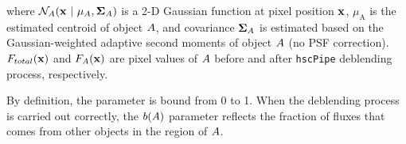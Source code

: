 \documentclass[useamsfonts]{pasj01}
\def\hscpipe{\texttt{hscPipe}}
\begin{document}
    \noindent
    where $\mathcal{N}_{\rm{A}}({ \bf x }\ |\  \mu_{\rm{A}}, {\bf\Sigma}_{\rm{A}})$
    is a 2-D Gaussian function at pixel position $\bf x$, $\mu_{\mathrm{A}}$ is the
    estimated centroid of object ${\rm A}$, and covariance ${\bf \Sigma}_{\mathrm{A}}$
    is estimated based on the Gaussian-weighted adaptive second moments of object
    ${\rm A}$ (no PSF correction).
    $F_{\mathrm{total}}({\bf x })$ and $F_{\rm{A}}({\bf x })$ are pixel values of
    ${\rm A}$ before and after \hscpipe{} deblending process, respectively.

    By definition, the parameter is bound from 0 to 1.
    When the deblending process is carried out correctly, the $b({\rm A})$ parameter
    reflects the fraction of fluxes that comes from other objects in the
    region of ${\rm A}$.

\label{lastpage}
\end{document}
